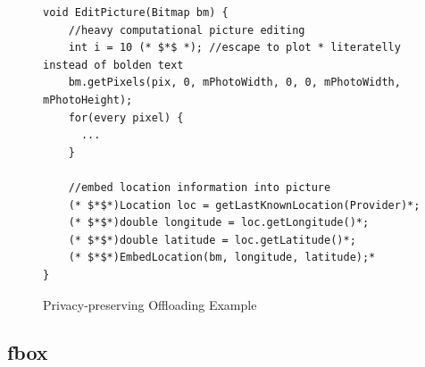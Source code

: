 \begin{figure}[h!]
\begin{lstlisting}
void EditPicture(Bitmap bm) {
    //heavy computational picture editing
    int i = 10 (* $*$ *); //escape to plot * literatelly instead of bolden text
    bm.getPixels(pix, 0, mPhotoWidth, 0, 0, mPhotoWidth, mPhotoHeight);
    for(every pixel) {
      ...
    }  
    
    //embed location information into picture
    (* $*$*)Location loc = getLastKnownLocation(Provider)*;
    (* $*$*)double longitude = loc.getLongitude()*;
    (* $*$*)double latitude = loc.getLatitude()*;
    (* $*$*)EmbedLocation(bm, longitude, latitude);*
}
\end{lstlisting}
\caption{Privacy-preserving Offloading Example}
\label{figure:MotivatingExample}
\end{figure}


\subsection{fbox}
\begin{center}
\end{center}

\begin{center}
\end{center}



